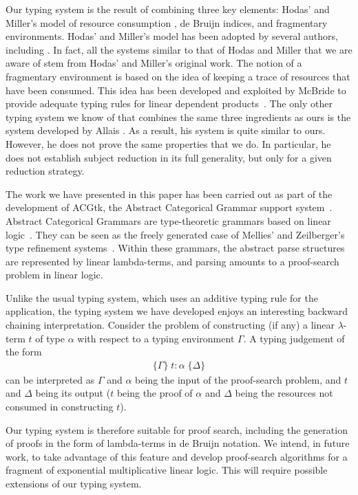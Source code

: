 \documentclass[submission,creativecommons]{eptcs}
\newcommand{\tytm}[4]{\{#1\}\;#2:#3\;\{#4\}}
\begin{document}
Our typing system is the result of combining three key elements: Hodas' and Miller's model of resource consumption
\cite{Hodas-Miller}, de Bruijn indices\cite{deBruijn:indices}, and fragmentary environments. Hodas'
and Miller's model has been adopted by several authors, including \cite{allais:LIPIcs.TYPES.2017.1,CervesatoHodasPfenning}.
In fact, all the systems similar to that of Hodas and Miller that we are aware of stem from Hodas' and Miller's original work.
The notion of a fragmentary environment is based on the idea of keeping a trace of resources that have been consumed.
This idea has been developed and exploited by McBride to provide adequate typing rules for linear dependent
products~\cite{McBride:IGPON}.
The only other typing system we know of that combines the same three ingredients as ours is the system developed by
Allais \cite{allais:LIPIcs.TYPES.2017.1}.
As a result, his system is quite similar to ours. However, he does not prove the same properties that we do.
In particular, he does not establish subject reduction in its full generality, but only for a given reduction strategy.

The work we have presented in this paper has been carried out as part of the development of ACGtk,
the Abstract Categorical Grammar support system~\cite{pogodalla:ACGtk}.
Abstract Categorical Grammars are type-theoretic grammars based on linear logic~\cite{deGroote:ACL01}.
They can be seen as the freely generated case of Mellies' and Zeilberger's type refinement systems~\cite{MelliesZeilberger}.
Within these grammars, the abstract parse structures are represented by linear lambda-terms, and parsing amounts
to a proof-search problem in linear logic.

Unlike the usual typing system, which uses an additive typing rule for the application, the typing system we have developed
enjoys an interesting backward chaining interpretation. Consider the problem of constructing (if any) a linear $\lambda$-term
$t$ of type $\alpha$ with respect to a typing environment $\Gamma$. A typing judgement of the form
\begin{align*}
\tytm{\Gamma}{t}{\alpha}{\Delta}
\end{align*}
can be interpreted as $\Gamma$ and $\alpha$ being the input of the proof-search problem, and $t$ and $\Delta$ being its
output ($t$ being the proof of $\alpha$ and $\Delta$ being the resources not consumed in constructing $t$).

Our typing system is therefore suitable for proof search, including the generation of proofs in the form of lambda-terms
in de Bruijn notation.
We intend, in future work, to take advantage of this feature and develop proof-search algorithms
for a fragment of exponential multiplicative linear logic.
This will require possible extensions of our typing system.



\end{document}
